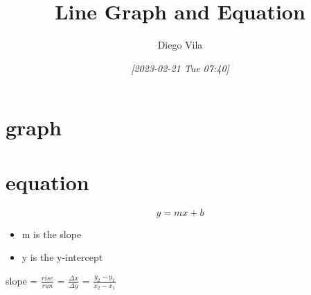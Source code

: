 \documentclass[11pt]{article}
\author{Diego Vila}
\date{\textit{[2023-02-21 Tue 07:40]}}
\title{Line Graph and Equation}
\begin{document}
\maketitle
\tableofcontents


\section{graph}
\label{sec:orge2b5c2d}

\section{equation}
\label{sec:org08e9274}
$$ y = mx + b $$
\begin{itemize}
\item m is the slope
\item y is the y-intercept
\end{itemize}

slope = \(\frac{rise}{run}\) = \(\frac{\Delta x}{\Delta y}\) = \(\frac{y_2 - y_1}{x_2 - x_1}\)
\end{document}
